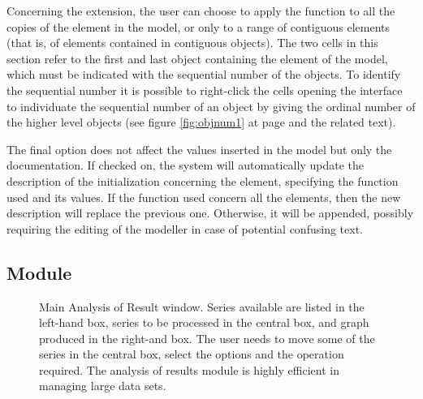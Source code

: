 \documentclass [11pt,a4paper] {book}
\begin{document}
Concerning the extension, the user can choose to apply the function to all the copies of the element in the model, or only to a range of contiguous elements (that is, of elements contained in contiguous objects). The two cells in this section refer to the first and last object containing the element of the model, which must be indicated with the sequential number of the objects. To identify the sequential number it is possible to right-click the cells opening the interface to individuate the sequential number of an object by giving the ordinal number of the higher level objects (see figure \ref{fig:objnum1} at page \pageref{fig:objnum1} and the related text).

The final option  does not affect the values inserted in the model but only the documentation. If checked on, the system will automatically update the description of the initialization concerning the element, specifying the function used and its values. If the function used concern all the elements, then the new description will replace the previous one. Otherwise, it will be appended, possibly requiring the editing of the modeller in case of potential confusing text.



\subsection{Module }\label{ssec:analres}

\begin{figure}[ht]
  \centering
  \caption{\small Main Analysis of Result window. Series available are listed in the left-hand box, series to be processed in the central box, and graph produced in the right-and box. The user needs to move some of the series in the central box, select the options and the operation required. The analysis of results module is highly efficient in managing large data sets.}
  \label{fig:anaresult}
\end{figure}
\end{document}
